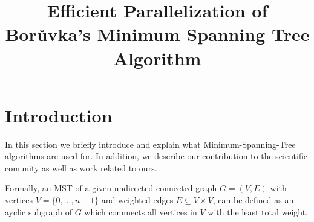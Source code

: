 \documentclass[letterpaper]{article}
\title{Efficient Parallelization of Bor\r{u}vka's Minimum Spanning Tree Algorithm}
\begin{document}
\maketitle

\begin{abstract}
\end{abstract}

\section{Introduction}
\label{sec:intro}
In this section we briefly introduce and explain what Minimum-Spanning-Tree algorithms are used for. In addition, we
describe our contribution to the scientific comunity as well as work related to ours.

Formally, an MST of a given undirected connected graph $G = (V, E)$ with vertices $V = \{ 0, \dotsc, n - 1 \}$ and
weighted edges $E \subseteq V \times V$, can be defined as an ayclic subgraph of $G$ which connnects all vertices in
$V$ with the least total weight.
\end{document}
